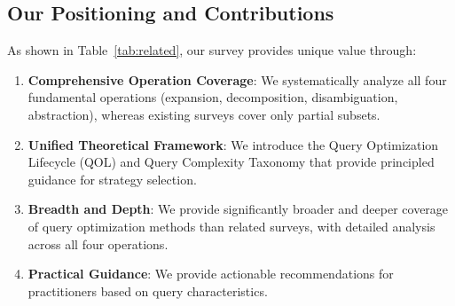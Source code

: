 \documentclass{article}
\begin{document}
\subsection{Our Positioning and Contributions}

\begin{table}[t]
    \centering
    \scriptsize
    \caption{Comparison with related surveys. Our survey uniquely focuses on query optimization with comprehensive coverage of four fundamental operations.}
    \label{tab:related}
\end{table}

As shown in Table~\ref{tab:related}, our survey provides unique value through:
\begin{enumerate}[leftmargin=*,nosep]
    \item \textbf{Comprehensive Operation Coverage}: We systematically analyze all four fundamental operations (expansion, decomposition, disambiguation, abstraction), whereas existing surveys cover only partial subsets.
    \item \textbf{Unified Theoretical Framework}: We introduce the Query Optimization Lifecycle (QOL) and Query Complexity Taxonomy that provide principled guidance for strategy selection.
    \item \textbf{Breadth and Depth}: We provide significantly broader and deeper coverage of query optimization methods than related surveys, with detailed analysis across all four operations.
    \item \textbf{Practical Guidance}: We provide actionable recommendations for practitioners based on query characteristics.
\end{enumerate}
\end{document}
